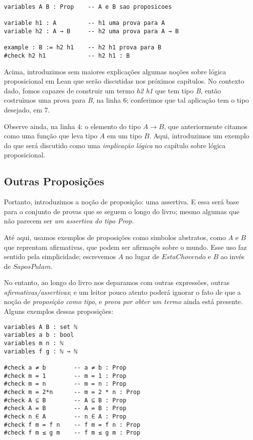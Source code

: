 \vspace{5mm}
\begin{lstlisting}
variables A B : Prop    -- A e B sao proposicoes

variable h1 : A         -- h1 uma prova para A
variable h2 : A → B     -- h2 uma prova para A → B

example : B := h2 h1    -- h2 h1 prova para B
#check h2 h1            -- h2 h1 : B
\end{lstlisting}
\vspace{5mm}

\noindent Acima, introduzimos sem maiores explicações algumas noções sobre lógica proposicional em Lean que serão discutidas nos próximos capítulos. No contexto dado, fomos capazes de construir um termo \textit{h2 h1} que tem tipo \textit{B}, então costruimos uma prova para \textit{B}, na linha $6$; conferimos que tal aplicação tem o tipo desejado, em $7$.

Observe ainda, na linha $4$: o elemento do tipo $A → B$, que anteriormente citamos como uma função que leva tipo $A$ em um tipo $B$.
Aqui, introduzimos um exemplo do que será discutido como uma \textit{implicação lógica} no capítulo sobre lógica proposicional.

\subsection{Outras Proposições}
Portanto, introduzimos a noção de proposição: uma assertiva. E essa será base para o conjunto de provas que se seguem o longo do livro; mesmo algumas que não parecem ser \textit{um assertiva do tipo Prop}.

Até aqui, usamos exemplos de proposições como simbolos abstratos, como $A$ e $B$ que reprentam afirmativas, que podem ser afirmaçẽs sobre o mundo. Esse uso faz sentido pela simplicidade; escrevemos $A$ no lugar de $EstaChovendo$ e $B$ ao invés de $SaposPulam$.

No entanto, ao longo do livro nos deparamos com outras expressões, outras \textit{afirmativas/assertivas}; e um leitor pouco atento poderá ignorar o fato de que a noção de \textit{proposição como tipo}, e \textit{prova por obter um termo} ainda está presente. Alguns exemplos dessas proposições:

\vspace{5mm}
\begin{lstlisting}
variables A B : set ℕ
variables a b : bool
variables m n : ℕ
variables f g : ℕ → ℕ

#check a ≠ b        -- a ≠ b : Prop
#check m = 1        -- m = 1 : Prop
#check m = n        -- m = n : Prop
#check m = 2*n      -- m = 2 * n : Prop
#check A ⊆ B        -- A ⊆ B : Prop
#check A = B        -- A = B : Prop
#check n ∈ A        -- n ∈ A : Prop
#check f m = f n    -- f m = f n : Prop
#check f m ≤ g m    -- f m ≤ g m : Prop
\end{lstlisting}
\vspace{5mm}

